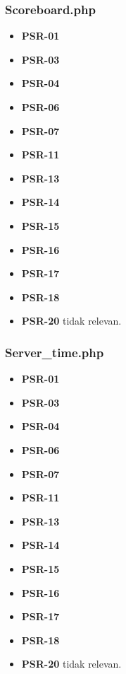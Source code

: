 \subsubsection{Scoreboard.php}
\begin{itemize}
	\item \textbf{PSR-01} 
	\item \textbf{PSR-03}
	\item \textbf{PSR-04}
	\item \textbf{PSR-06}
	\item \textbf{PSR-07}
	\item \textbf{PSR-11}
	\item \textbf{PSR-13}
	\item \textbf{PSR-14}
	\item \textbf{PSR-15}
	\item \textbf{PSR-16}
	\item \textbf{PSR-17} 
	\item \textbf{PSR-18} 
	\item \textbf{PSR-20} tidak relevan.
\end{itemize}

\subsubsection{Server\_time.php}
\begin{itemize}
	\item \textbf{PSR-01} 
	\item \textbf{PSR-03}
	\item \textbf{PSR-04}
	\item \textbf{PSR-06}
	\item \textbf{PSR-07}
	\item \textbf{PSR-11}
	\item \textbf{PSR-13}
	\item \textbf{PSR-14}
	\item \textbf{PSR-15}
	\item \textbf{PSR-16}
	\item \textbf{PSR-17} 
	\item \textbf{PSR-18} 
	\item \textbf{PSR-20} tidak relevan.
\end{itemize}

